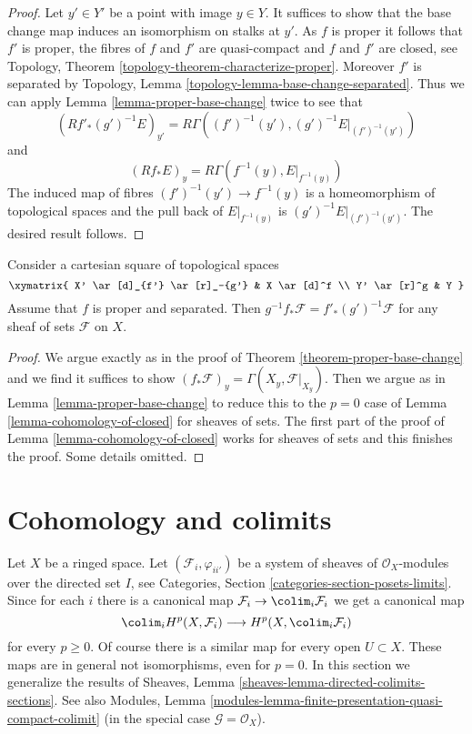 \begin{proof}
Let $y' \in Y'$ be a point with image $y \in Y$. It suffices to show that
the base change map induces an isomorphism on stalks at $y'$.
As $f$ is proper it follows that $f'$ is proper, the
fibres of $f$ and $f'$ are quasi-compact and $f$ and $f'$ are closed, see
Topology, Theorem \ref{topology-theorem-characterize-proper}.
Moreover $f'$ is separated by
Topology, Lemma \ref{topology-lemma-base-change-separated}.
Thus we can apply Lemma \ref{lemma-proper-base-change} twice to see that
$$
(Rf'_*(g')^{-1}E)_{y'} = R\Gamma((f')^{-1}(y'), (g')^{-1}E|_{(f')^{-1}(y')})
$$
and
$$
(Rf_*E)_y = R\Gamma(f^{-1}(y), E|_{f^{-1}(y)})
$$
The induced map of fibres $(f')^{-1}(y') \to f^{-1}(y)$ is
a homeomorphism of topological spaces and the pull back of
$E|_{f^{-1}(y)}$ is $(g')^{-1}E|_{(f')^{-1}(y')}$. The
desired result follows.
\end{proof}

\begin{lemma}
\label{lemma-proper-base-change-sheaves-of-sets}
Consider a cartesian square of topological spaces
$$
\xymatrix{
X' \ar[d]_{f'} \ar[r]_-{g'} & X \ar[d]^f \\
Y' \ar[r]^g & Y
}
$$
Assume that $f$ is proper and separated. Then
$g^{-1}f_*\mathcal{F} = f'_*(g')^{-1}\mathcal{F}$
for any sheaf of sets $\mathcal{F}$ on $X$.
\end{lemma}

\begin{proof}
We argue exactly as in the proof of Theorem \ref{theorem-proper-base-change}
and we find it suffices to show
$(f_*\mathcal{F})_y = \Gamma(X_y, \mathcal{F}|_{X_y})$.
Then we argue as in Lemma \ref{lemma-proper-base-change}
to reduce this to the $p = 0$ case of Lemma \ref{lemma-cohomology-of-closed}
for sheaves of sets. The first part of the proof of
Lemma \ref{lemma-cohomology-of-closed}
works for sheaves of sets and this finishes the proof.
Some details omitted.
\end{proof}



\section{Cohomology and colimits}
\label{section-limits}

\noindent
Let $X$ be a ringed space. Let $(\mathcal{F}_i, \varphi_{ii'})$ be
a system of sheaves of $\mathcal{O}_X$-modules over the directed set $I$, see
Categories, Section \ref{categories-section-posets-limits}.
Since for each $i$ there is a canonical map
$\mathcal{F}_i \to \colim_i \mathcal{F}_i$ we get a
canonical map
$$
\colim_i H^p(X, \mathcal{F}_i)
\longrightarrow
H^p(X, \colim_i \mathcal{F}_i)
$$
for every $p \geq 0$. Of course there is a similar map for
every open $U \subset X$. These maps are in general not isomorphisms,
even for $p = 0$. In this section we generalize the results of
Sheaves, Lemma \ref{sheaves-lemma-directed-colimits-sections}.
See also
Modules, Lemma \ref{modules-lemma-finite-presentation-quasi-compact-colimit}
(in the special case $\mathcal{G} = \mathcal{O}_X$).

